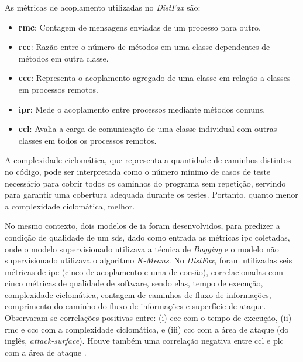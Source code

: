 As métricas de acoplamento utilizadas no \textit{DistFax} são:
\begin{itemize}
    \item \textbf{\gls{rmc}}: Contagem de mensagens enviadas de um processo para outro.
    \item \textbf{\gls{rcc}}: Razão entre o número de métodos em uma classe dependentes de métodos em outra classe.
    \item \textbf{\gls{ccc}}: Representa o acoplamento agregado de uma classe em relação a classes em processos remotos.
    \item \textbf{\gls{ipr}}: Mede o acoplamento entre processos mediante métodos comuns.
    \item \textbf{\gls{ccl}}: Avalia a carga de comunicação de uma classe individual com outras classes em todos os processos remotos.
\end{itemize}

A complexidade ciclomática, que representa a quantidade de caminhos distintos no código, pode ser interpretada como o número mínimo de casos de teste necessário para cobrir todos os caminhos do programa sem repetição, servindo para garantir uma cobertura adequada durante os testes. Portanto, quanto menor a complexidade ciclomática, melhor.

No mesmo contexto, dois modelos de \gls{ia} foram desenvolvidos, para predizer a condição de qualidade de um \gls{sds}, dado como entrada as métricas \gls{ipc} coletadas, onde o modelo supervisionado utilizava a técnica de \textit{Bagging} e o modelo não supervisionado utilizava o algoritmo \textit{K-Means}. No \textit{DistFax}, foram utilizadas seis métricas de \gls{ipc} (cinco de acoplamento e uma de coesão), correlacionadas com cinco métricas de qualidade de software, sendo elas, tempo de execução, complexidade ciclomática, contagem de caminhos de fluxo de informações, comprimento do caminho do fluxo de informações e superfície de ataque. Observaram-se correlações positivas entre: (i) \gls{ccc} com o tempo de execução, (ii) \gls{rmc} e \gls{ccc} com a complexidade ciclomática, e (iii) \gls{ccc} com a área de ataque (do inglês, \textit{attack-surface}). Houve também uma correlação negativa entre \gls{ccl} e \gls{plc} com a área de ataque \cite{DistFax}.

